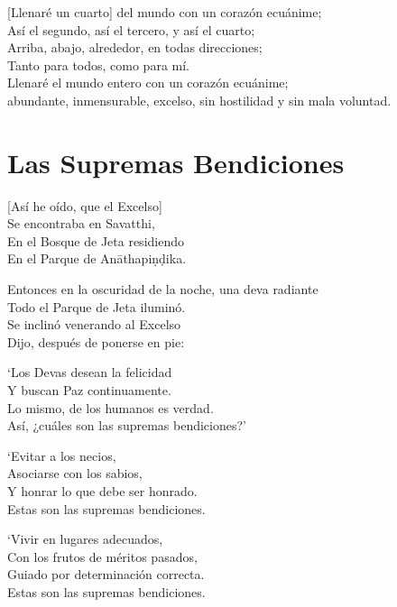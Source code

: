 [Llenaré un cuarto] del mundo con un corazón ecuánime;\\
Así el segundo, así el tercero, y así el cuarto;\\
Arriba, abajo, alrededor, en todas direcciones;\\
Tanto para todos, como para mí.\\
Llenaré el mundo entero con un corazón ecuánime;\\ abundante, inmensurable, excelso, sin hostilidad y sin mala voluntad.


\clearpage

\chapter{Las Supremas Bendiciones}


\begin{leader}
\end{leader}

[Así he oído, que el Excelso]\\
Se encontraba en Savatthi,\\
En el Bosque de Jeta residiendo\\
En el Parque de Anāthapiṇḍika.

Entonces en la oscuridad de la noche, una deva radiante\\
Todo el Parque de Jeta iluminó.\\
Se inclinó venerando al Excelso\\
Dijo, después de ponerse en pie:

`Los Devas desean la felicidad\\
Y buscan Paz continuamente.\\
Lo mismo, de los humanos es verdad.\\
Así, ¿cuáles son las supremas bendiciones?'

`Evitar a los necios,\\
Asociarse con los sabios,\\
Y honrar lo que debe ser honrado.\\
Estas son las supremas bendiciones.

`Vivir en lugares adecuados,\\
Con los frutos de méritos pasados,\\
Guiado por determinación correcta.\\
Estas son las supremas bendiciones.

